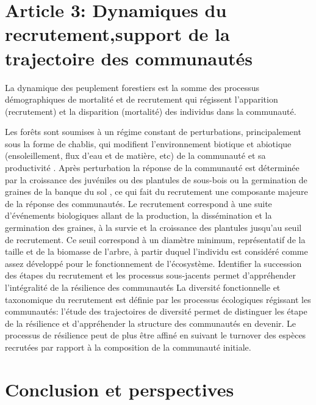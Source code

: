 \documentclass[
  11pt,
  french,
  A4paper,
  extrafontsizes,onecolumn,openright
  ]{memoir}
\begin{document}
\chapter{Article 3: Dynamiques du recrutement,support de la trajectoire
des
communautés}\label{article-3-dynamiques-du-recrutementsupport-de-la-trajectoire-des-communautes}

La dynamique des peuplement forestiers est la somme des processus
démographiques de mortalité et de recrutement qui régissent l'apparition
(recrutement) et la disparition (mortalité) des individus dans la
communauté.

Les forêts sont soumises à un régime constant de perturbations,
principalement sous la forme de chablis, qui modifient l'environnement
biotique et abiotique (ensoleillement, flux d'eau et de matière, etc) de
la communauté et sa productivité \autocite{Otani2018}. Après
perturbation la réponse de la communauté est déterminée par la
croissance des juvéniles ou des plantules de sous-bois ou la germination
de graines de la banque du sol
\autocites{Denslow1980}{Schnitzer2001}{Asner2004}, ce qui fait du
recrutement une composante majeure de la réponse des communautés. Le
recrutement correspond à une suite d'événements biologiques allant de la
production, la dissémination et la germination des graines, à la survie
et la croissance des plantules jusqu'au seuil de recrutement. Ce seuil
correspond à un diamètre minimum, représentatif de la taille et de la
biomasse de l'arbre, à partir duquel l'individu est considéré comme
assez développé pour le fonctionnement de l'écosystème. Identifier la
succession des étapes du recrutement et les processus sous-jacents
permet d'appréhender l'intégralité de la résilience des communautés La
diversité fonctionnelle et taxonomique du recrutement est définie par
les processus écologiques régissant les communautés: l'étude des
trajectoires de diversité permet de distinguer les étape de la
résilience et d'appréhender la structure des communautés en devenir. Le
processus de résilience peut de plus être affiné en suivant le turnover
des espèces recrutées par rapport à la composition de la communauté
initiale.

\chapter{Conclusion et perspectives}\label{conclusion-et-perspectives}


\end{document}
